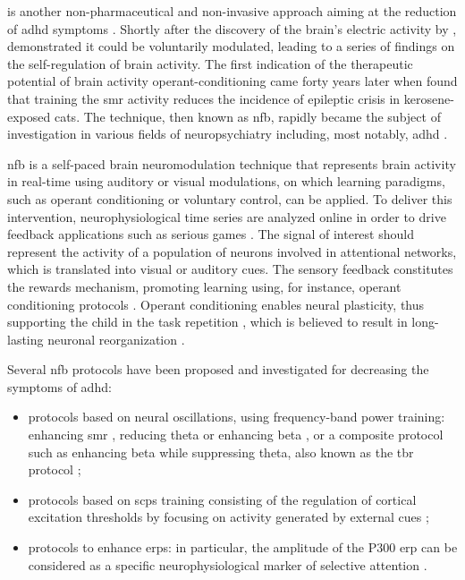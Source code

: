  is another non-pharmaceutical and non-invasive approach aiming at the reduction of \gls{adhd} symptoms 
\citep{Arns2015, Steffert2010, Marzbani2016}. Shortly after the discovery of the brain's electric activity by 
\citet{Berger1929}, \citet{Durup1935} demonstrated it could be voluntarily modulated, leading to a series of findings on the 
self-regulation of brain activity. The first indication of the therapeutic potential of brain activity operant-conditioning 
came forty years later when \citet{Sterman1974} found that training the \gls{smr} activity reduces the incidence 
of epileptic crisis in kerosene-exposed cats. The technique, then known as \gls{nfb}, rapidly became the subject of investigation in various 
fields of neuropsychiatry including, most notably, \gls{adhd} \citep{Lubar1976, Rossiter1995, Linden1996, Maurizio2014}.

\Gls{nfb} is a self-paced brain neuromodulation technique that represents brain activity in real-time using auditory 
or visual modulations, on which learning paradigms, such as operant conditioning
\citep{Reynolds1975} or voluntary control, can be applied. To deliver this intervention, neurophysiological time series 
are analyzed online in order to drive feedback applications such as serious games \citep{Wang2010}. 
The signal of interest should represent the activity of a population of neurons involved in attentional networks, which is translated into 
visual or auditory cues. The sensory feedback constitutes the rewards mechanism, promoting learning using, for instance, operant conditioning 
protocols \citep{Sherlin2011}. Operant conditioning enables neural plasticity, thus supporting the child in the task repetition \citep{Skinner1961}, 
which is believed to result in long-lasting neuronal reorganization \citep{VanDoren2017}. 

Several \gls{nfb} protocols have been proposed and investigated for decreasing the symptoms of \gls{adhd}:
\begin{itemize} 
  \item protocols based on neural oscillations, using frequency-band power training: enhancing \gls{smr} \citep{Beauregard2006}, reducing theta  
	  \citep{Marzbani2016} or enhancing beta \citep{Kropotov2005}, or a composite protocol such as enhancing beta while suppressing theta, also known as the \gls{tbr}
    protocol \citep{Lubar1976, Arns2013}; 
  \item protocols based on \glspl{scp} training consisting of the regulation of
    cortical excitation thresholds by focusing on activity generated by external cues 
    \citep{Heinrich2004, Banaschewski2007}; 
  \item protocols to enhance \glspl{erp}: in particular, the amplitude of the P300 \gls{erp} can be considered as a specific
    neurophysiological marker of selective attention \citep{Fouillen2017}.  
\end{itemize} 

